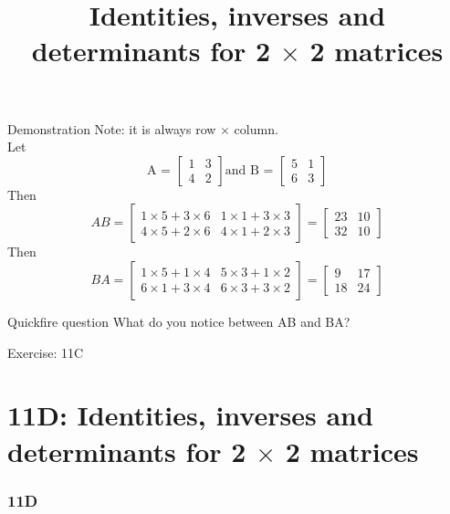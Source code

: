 \documentclass[
	11pt, %
]{beamer}
\begin{document}
\begin{block}{Demonstration}
    Note: it is always row $\times$ column.\\
    Let 
    \[
        \text{A = }
        \begin{bmatrix}
            1 & 3\\
            4 & 2
        \end{bmatrix}
        \text{and B = }
        \begin{bmatrix}
            5 & 1\\
            6 & 3
        \end{bmatrix}
    \]
    Then 
    \[
        AB = 
        \begin{bmatrix}
            1 \times 5 + 3 \times 6 & 1 \times 1 + 3 \times 3\\
            4 \times 5 + 2 \times 6 & 4 \times 1 + 2 \times 3
        \end{bmatrix}
        =
        \begin{bmatrix}
            23 & 10\\
            32 & 10
        \end{bmatrix}
    \]
    Then
    \[
        BA = 
        \begin{bmatrix}
            1 \times 5 + 1 \times 4 & 5 \times 3 + 1 \times 2\\
            6 \times 1 + 3 \times 4 & 6 \times 3 + 3 \times 2
        \end{bmatrix}
        =
        \begin{bmatrix}
            9 & 17\\
            18 & 24
        \end{bmatrix}
    \]
\end{block}
\begin{block}{Quickfire question}
    What do you notice between AB and BA?
\end{block}
\begin{frame}{Exercise: 11C}
\end{frame}
\section{11D: Identities, inverses and determinants for 2 $\times$ 2 matrices}
\begin{frame}
    \frametitle{11D}
    \begin{center}
        \title{Identities, inverses and determinants for 2 $\times$ 2 matrices}
        \maketitle
    \end{center}
\end{frame}
\end{document}
